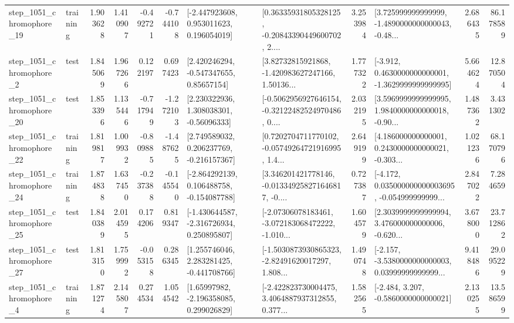 \begin{tabular}{llrrrrllrlrr}
 step\_1051\_chromophore\_19 &  training &      1.903628 &    1.410907 &     -0.492721 & -0.744108 &    [-2.447923608, 0.953011623, 0.196054019] &  [0.36335931805328125, -0.20843390449600702, 2.... &       3.253984 &  [3.725999999999999, -1.4890000000000043, -0.48... &            2.686435 &         86.178589 \\
  step\_1051\_chromophore\_2 &      test &      1.845069 &    1.967266 &      0.122197 &  0.697423 &     [2.420246294, -0.547347655, 0.85657154] &  [3.82732815921868, -1.420983627247166, 1.50136... &       1.777322 &  [-3.912, 0.4630000000000001, -1.3629999999999995] &            5.664624 &         12.870504 \\
 step\_1051\_chromophore\_20 &      test &      1.853396 &    1.135446 &     -0.717949 & -1.272103 &     [2.230322936, 1.308038301, -0.56096333] &  [-0.5062956927646154, -0.32122482524970486, 0.... &       2.032195 &  [3.5969999999999995, 1.9840000000000018, -0.90... &            1.487362 &          3.431302 \\
 step\_1051\_chromophore\_22 &  training &      1.819817 &    1.009932 &     -0.809885 & -1.487625 &    [2.749589032, 0.206237769, -0.216157367] &  [0.7202704711770102, -0.05749264721916995, 1.4... &       2.649199 &  [4.186000000000001, 0.2430000000000021, -0.303... &            1.021236 &         68.170796 \\
 step\_1051\_chromophore\_24 &  training &      1.874838 &    1.637450 &     -0.237388 & -0.145540 &   [-2.864292139, 0.106488758, -0.154087788] &  [3.346201421778146, -0.013349258271646817, -0.... &       0.727387 &  [-4.172, 0.035000000000003695, -0.054999999999... &            2.847022 &          7.284659 \\
 step\_1051\_chromophore\_25 &      test &      1.840389 &    2.014595 &      0.174206 &  0.819347 &   [-1.430644587, -2.316726934, 0.250895807] &  [-2.07306078183461, -3.072183068472222, -1.010... &       1.604579 &  [2.3039999999999994, 3.476000000000006, -0.620... &            3.678000 &         23.712862 \\
 step\_1051\_chromophore\_27 &      test &      1.813150 &    1.759992 &     -0.053158 &  0.286345 &    [1.255746046, 2.283281425, -0.441708766] &  [-1.5030873930865323, -2.82491620017297, 1.808... &       1.490748 &  [-2.157, -3.5380000000000003, 0.03999999999999... &            9.418486 &         29.095229 \\
  step\_1051\_chromophore\_4 &  training &      1.871274 &    2.145807 &      0.274534 &  1.054542 &     [1.65997982, -2.196358085, 0.299026829] &  [-2.422823730004475, 3.4064887937312855, 0.377... &       1.582565 &               [-2.484, 3.207, -0.5860000000000021] &            2.130255 &         13.586599 \\

\end{tabular}

